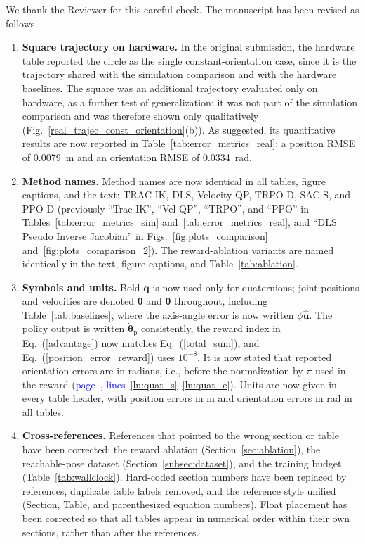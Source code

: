 \documentclass[11pt]{elsarticle}
\newcommand{\mlines}[2]{\textcolor{blue}{page~\pageref{#1}, lines~\ref{#1}--\ref{#2}}}
\begin{document}
\begin{responsebox}
We thank the Reviewer for this careful check. The manuscript has been revised as follows.

\begin{enumerate}
  \item \textbf{Square trajectory on hardware.} In the original submission, the hardware table reported the circle as the single constant-orientation case, since it is the trajectory shared with the simulation comparison and with the hardware baselines. The square was an additional trajectory evaluated only on hardware, as a further test of generalization; it was not part of the simulation comparison and was therefore shown only qualitatively (Fig.~\ref{real_trajec_const_orientation}(b)). As suggested, its quantitative results are now reported in Table~\ref{tab:error_metrics_real}: a position RMSE of 0.0079~m and an orientation RMSE of 0.0334~rad.

  \item \textbf{Method names.} Method names are now identical in all tables, figure captions, and the text: TRAC-IK, DLS, Velocity QP, TRPO-D, SAC-S, and PPO-D (previously ``Trac-IK'', ``Vel QP'', ``TRPO'', and ``PPO'' in Tables~\ref{tab:error_metrics_sim} and~\ref{tab:error_metrics_real}, and ``DLS Pseudo Inverse Jacobian'' in Figs.~\ref{fig:plots_comparison} and~\ref{fig:plots_comparison_2}). The reward-ablation variants are named identically in the text, figure captions, and Table~\ref{tab:ablation}.

  \item \textbf{Symbols and units.} Bold $\mathbf{q}$ is now used only for quaternions; joint positions and velocities are denoted $\boldsymbol{\theta}$ and $\dot{\boldsymbol{\theta}}$ throughout, including Table~\ref{tab:baselines}, where the axis-angle error is now written $\phi\hat{\mathbf{u}}$. The policy output is written $\dot{\boldsymbol{\theta}}_\text{p}$ consistently, the reward index in Eq.~(\ref{advantage}) now matches Eq.~(\ref{total_sum}), and Eq.~(\ref{position_error_reward}) uses $10^{-8}$. It is now stated that reported orientation errors are in radians, i.e., before the normalization by $\pi$ used in the reward (\mlines{ln:quat_s}{ln:quat_e}). Units are now given in every table header, with position errors in m and orientation errors in rad in all tables.

  \item \textbf{Cross-references.} References that pointed to the wrong section or table have been corrected: the reward ablation (Section~\ref{sec:ablation}), the reachable-pose dataset (Section~\ref{subsec:dataset}), and the training budget (Table~\ref{tab:wallclock}). Hard-coded section numbers have been replaced by references, duplicate table labels removed, and the reference style unified (Section, Table, and parenthesized equation numbers). Float placement has been corrected so that all tables appear in numerical order within their own sections, rather than after the references.

\end{enumerate}
\end{responsebox}
\end{document}
